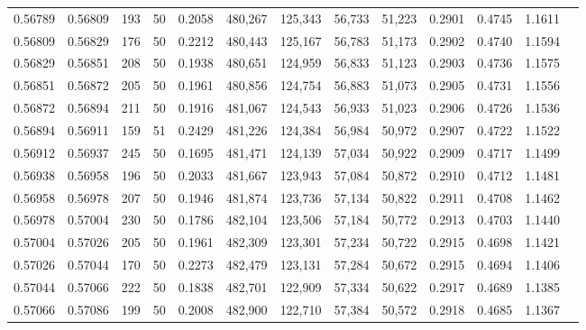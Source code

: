 \begin{tabular}{rrrrrrrrrrrrr}
0.56789 & 0.56809 &   193 &  50 &                                     0.2058 & 480,267 & 125,343 &  56,733 &  51,223 & 0.2901 & 0.4745 & 1.1611 \\
0.56809 & 0.56829 &   176 &  50 &                                     0.2212 & 480,443 & 125,167 &  56,783 &  51,173 & 0.2902 & 0.4740 & 1.1594 \\
0.56829 & 0.56851 &   208 &  50 &                                     0.1938 & 480,651 & 124,959 &  56,833 &  51,123 & 0.2903 & 0.4736 & 1.1575 \\
0.56851 & 0.56872 &   205 &  50 &                                     0.1961 & 480,856 & 124,754 &  56,883 &  51,073 & 0.2905 & 0.4731 & 1.1556 \\
0.56872 & 0.56894 &   211 &  50 &                                     0.1916 & 481,067 & 124,543 &  56,933 &  51,023 & 0.2906 & 0.4726 & 1.1536 \\
0.56894 & 0.56911 &   159 &  51 &                                     0.2429 & 481,226 & 124,384 &  56,984 &  50,972 & 0.2907 & 0.4722 & 1.1522 \\
0.56912 & 0.56937 &   245 &  50 &                                     0.1695 & 481,471 & 124,139 &  57,034 &  50,922 & 0.2909 & 0.4717 & 1.1499 \\
0.56938 & 0.56958 &   196 &  50 &                                     0.2033 & 481,667 & 123,943 &  57,084 &  50,872 & 0.2910 & 0.4712 & 1.1481 \\
0.56958 & 0.56978 &   207 &  50 &                                     0.1946 & 481,874 & 123,736 &  57,134 &  50,822 & 0.2911 & 0.4708 & 1.1462 \\
0.56978 & 0.57004 &   230 &  50 &                                     0.1786 & 482,104 & 123,506 &  57,184 &  50,772 & 0.2913 & 0.4703 & 1.1440 \\
0.57004 & 0.57026 &   205 &  50 &                                     0.1961 & 482,309 & 123,301 &  57,234 &  50,722 & 0.2915 & 0.4698 & 1.1421 \\
0.57026 & 0.57044 &   170 &  50 &                                     0.2273 & 482,479 & 123,131 &  57,284 &  50,672 & 0.2915 & 0.4694 & 1.1406 \\
0.57044 & 0.57066 &   222 &  50 &                                     0.1838 & 482,701 & 122,909 &  57,334 &  50,622 & 0.2917 & 0.4689 & 1.1385 \\
0.57066 & 0.57086 &   199 &  50 &                                     0.2008 & 482,900 & 122,710 &  57,384 &  50,572 & 0.2918 & 0.4685 & 1.1367 \\

\end{tabular}
